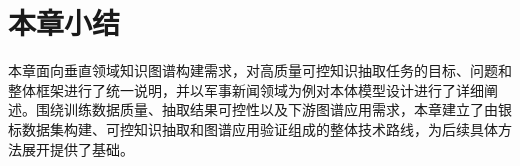 \FloatBarrier










\section{本章小结}

本章面向垂直领域知识图谱构建需求，对高质量可控知识抽取任务的目标、问题和整体框架进行了统一说明，并以军事新闻领域为例对本体模型设计进行了详细阐述。围绕训练数据质量、抽取结果可控性以及下游图谱应用需求，本章建立了由银标数据集构建、可控知识抽取和图谱应用验证组成的整体技术路线，为后续具体方法展开提供了基础。
